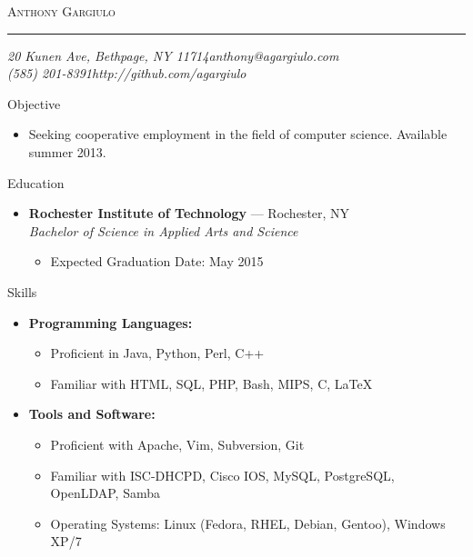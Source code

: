 \documentclass[10pt,oneside]{article}
\makeatletter
\newcommand{\name}{Anthony Gargiulo}
\newcommand{\addr}{20 Kunen Ave, Bethpage, NY 11714}
\newcommand{\phone}{(585) 201-8391}
\newcommand{\email}{anthony@agargiulo.com}
\newcommand{\github}{http://github.com/agargiulo}
\newcommand{\bigname}[1]{
	\begin{center}\fontfamily{ppl}\selectfont\Huge\scshape#1\end{center}
}
\newenvironment{ressection}[1]{
	\vspace{3pt}
	{\fontfamily{ppl}\selectfont\Large#1}
	\begin{itemize}
	\vspace{2pt}
}{
	\end{itemize}
}
\newcommand{\resitem}[1]{
	\vspace{-2pt}
	\item \begin{flushleft} #1 \end{flushleft}
}
\newcommand{\ressubitem}[1]{
	\vspace{-1pt}
	\item \begin{flushleft} #1 \end{flushleft}
}
\newcommand{\resbigitem}[3]{
	\vspace{-3pt}
	\item
	\textbf{#1} --- #2 \\
	\textit{#3}
}
\newenvironment{ressubsec}[3]{
	\resbigitem{#1}{#2}{#3}
	\vspace{-1pt}
	\begin{itemize}
}{
	\end{itemize}
}
\newenvironment{reslist}[1]{
	\resitem{\textbf{#1}}
	\vspace{-3pt}
	\begin{itemize}
}{
	\end{itemize}
}
\makeatother
\begin{document}
 \selectfont

\bigname{\name}

\vspace{-4pt} \rule{\textwidth}{1pt}

\vspace{-1pt} {\normalsize\itshape \addr \hfill \email \\ \phone \hfill \github}

\vspace{15 pt}



\begin{ressection}{Objective}

	\ressubitem{Seeking cooperative employment in the field of computer science. Available summer 2013.}

\end{ressection}
\begin{ressection}{Education}

	\begin{ressubsec}{Rochester Institute of Technology}{Rochester, NY}{Bachelor of Science in Applied Arts and Science}
		\ressubitem{Expected Graduation Date: May 2015}
	\end{ressubsec}

\end{ressection}

\begin{ressection}{Skills}


	\begin{reslist}{Programming Languages:}
		\ressubitem{Proficient in Java, Python, Perl, C++}
		\ressubitem{Familiar with HTML, SQL, PHP, Bash, MIPS, C, \LaTeX}
	\end{reslist}

	\begin{reslist}{Tools and Software:}
		\ressubitem{Proficient with Apache, Vim, Subversion, Git}
		\ressubitem{Familiar with ISC-DHCPD, Cisco IOS, MySQL, PostgreSQL, OpenLDAP, Samba}
		\ressubitem{Operating Systems: Linux (Fedora, RHEL, Debian, Gentoo), Windows XP/7}
	\end{reslist}

\end{ressection}
\end{document}
